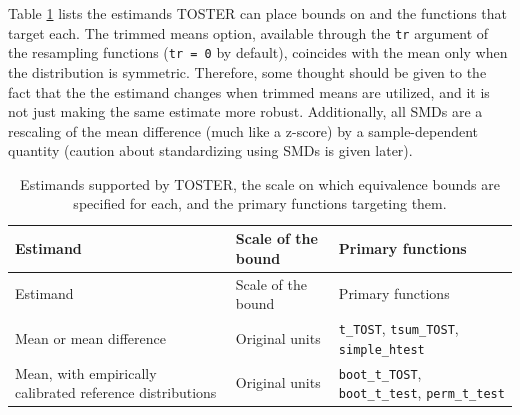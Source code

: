 \documentclass[]{interact}
\theoremstyle{plain}%
\theoremstyle{definition}
\theoremstyle{remark}
\begin{document}
Table \ref{tab:estimands} lists the estimands TOSTER can place bounds on
and the functions that target each. The trimmed means option, available
through the \texttt{tr} argument of the resampling functions
(\texttt{tr\ =\ 0} by default), coincides with the mean only when the
distribution is symmetric. Therefore, some thought should be given to
the fact that the the estimand changes when trimmed means are utilized,
and it is not just making the same estimate more robust. Additionally,
all SMDs are a rescaling of the mean difference (much like a z-score) by
a sample-dependent quantity (caution about standardizing using SMDs is
given later).

\begin{longtable}[]{@{}
  >{\raggedright\arraybackslash}p{}
  >{\raggedright\arraybackslash}p{}
  >{\raggedright\arraybackslash}p{}@{}}
\caption{\label{tab:estimands}Estimands supported by TOSTER, the scale
on which equivalence bounds are specified for each, and the primary
functions targeting them.}\tabularnewline
\toprule\noalign{}
\begin{minipage}[b]{\linewidth}\raggedright
Estimand
\end{minipage} & \begin{minipage}[b]{\linewidth}\raggedright
Scale of the bound
\end{minipage} & \begin{minipage}[b]{\linewidth}\raggedright
Primary functions
\end{minipage} \\
\midrule\noalign{}
\endfirsthead
\toprule\noalign{}
\begin{minipage}[b]{\linewidth}\raggedright
Estimand
\end{minipage} & \begin{minipage}[b]{\linewidth}\raggedright
Scale of the bound
\end{minipage} & \begin{minipage}[b]{\linewidth}\raggedright
Primary functions
\end{minipage} \\
\midrule\noalign{}
\endhead
\bottomrule\noalign{}
\endlastfoot
Mean or mean difference & Original units & \texttt{t\_TOST},
\texttt{tsum\_TOST}, \texttt{simple\_htest} \\
Mean, with empirically calibrated reference distributions & Original
units & \texttt{boot\_t\_TOST}, \texttt{boot\_t\_test},
\texttt{perm\_t\_test} \\

\end{longtable}
\end{document}
